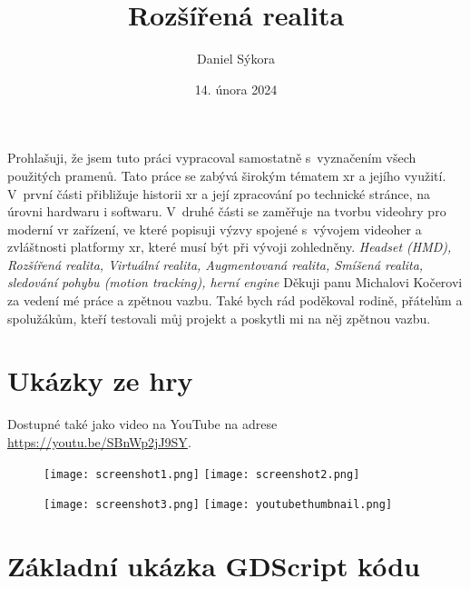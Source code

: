 \documentclass[12pt]{report}
\author{Daniel Sýkora}
\title{Rozšířená realita}
\date{14. února 2024}
\begin{document}
\mytitlepage
\prohlaseni
{
	Prohlašuji, že jsem tuto práci vypracoval samostatně s~vyznačením všech použitých pramenů.
}
\abstrakt
{ %
	Tato práce se zabývá širokým tématem \gls{xr} a jejího využití. V~první části přibližuje historii \gls{xr} a její zpracování po technické stránce, na úrovni hardwaru i softwaru. V~druhé části se zaměřuje na tvorbu videohry pro moderní \gls{vr} zařízení, ve které popisuji výzvy spojené s~vývojem videoher a zvláštnosti platformy \gls{xr}, které musí být při vývoji zohledněny.
}
{ %
	\textit{Headset (HMD), Rozšířená realita, Virtuální realita, Augmentovaná realita, Smíšená realita, sledování pohybu (motion tracking), herní engine}
}
\podekovani
{
	Děkuji panu Michalovi Kočerovi za vedení mé práce a zpětnou vazbu. Také bych rád poděkoval rodině, přátelům a spolužákům, kteří testovali můj projekt a poskytli mi na něj zpětnou vazbu.
}

\tableofcontents
\newpage






\nocite{*}

\printbibliography

\printglossary[title={Zkratky}]

\listoffigures
{}

\appendix

\chapter{Ukázky ze hry}\label{apx_screenshots}
Dostupné také jako video na YouTube na adrese \url{https://youtu.be/SBnWp2jJ9SY}.
\begin{figure}[H]
	\centering
	\texttt{[image: screenshot1.png]}
	\texttt{[image: screenshot2.png]}
\end{figure}
\begin{figure}[H]
	\centering
	\texttt{[image: screenshot3.png]}
	\texttt{[image: youtubethumbnail.png]}
\end{figure}

\chapter{Základní ukázka GDScript kódu}\label{apx_gscript_sample}

\end{document}
